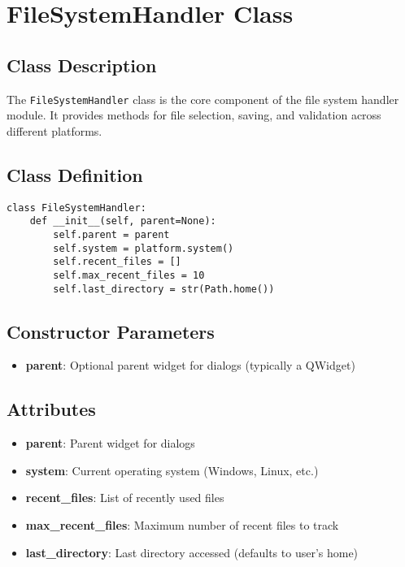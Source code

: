 \section{FileSystemHandler Class}

\subsection{Class Description}

The \texttt{FileSystemHandler} class is the core component of the file system handler module. It provides methods for file selection, saving, and validation across different platforms.

\subsection{Class Definition}

\begin{verbatim}
class FileSystemHandler:
    def __init__(self, parent=None):
        self.parent = parent
        self.system = platform.system()
        self.recent_files = []
        self.max_recent_files = 10
        self.last_directory = str(Path.home())
\end{verbatim}

\subsection{Constructor Parameters}

\begin{itemize}
    \item \textbf{parent}: Optional parent widget for dialogs (typically a QWidget)
\end{itemize}

\subsection{Attributes}

\begin{itemize}
    \item \textbf{parent}: Parent widget for dialogs
    \item \textbf{system}: Current operating system (Windows, Linux, etc.)
    \item \textbf{recent\_files}: List of recently used files
    \item \textbf{max\_recent\_files}: Maximum number of recent files to track
    \item \textbf{last\_directory}: Last directory accessed (defaults to user's home)
\end{itemize}

